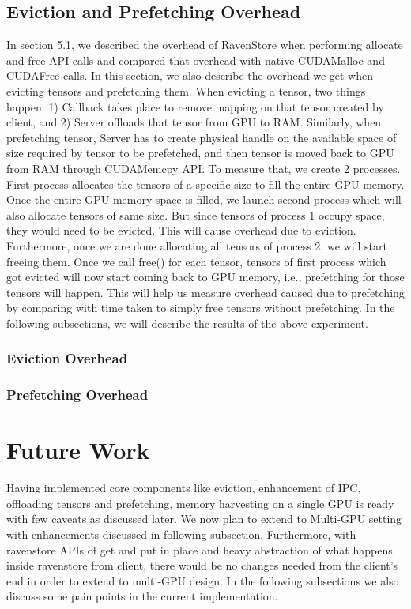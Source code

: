 \documentclass{article}
\begin{document}
\subsection{Eviction and Prefetching Overhead}
In section 5.1, we described the overhead of RavenStore when performing allocate and free API calls and compared that overhead with 
native CUDAMalloc and CUDAFree calls. In this section, we also describe the overhead we get when evicting tensors and prefetching them.
When evicting a tensor, two things happen: 1) Callback takes place to remove mapping on that tensor created by client, and 2) Server
offloads that tensor from GPU to RAM. Similarly, when prefetching tensor, Server has to create physical handle on the available space of
size required by tensor to be prefetched, and then tensor is moved back to GPU from RAM through CUDAMemcpy API.
To measure that, we create 2 processes. First process allocates the tensors of a specific size to fill the entire GPU memory. Once the entire GPU
memory space is filled, we launch second process which will also allocate tensors of same size. But since tensors of process 1 occupy space, they would
need to be evicted. This will cause overhead due to eviction. Furthermore, once we are done allocating all tensors of process 2, we will start freeing them.
Once we call free() for each tensor, tensors of first process which got evicted will now start coming back to GPU memory, i.e., prefetching for those
tensors will happen. This will help us measure overhead caused due to prefetching by comparing with time taken to simply free tensors without prefetching.
In the following subsections, we will describe the results of the above experiment.

\subsubsection{Eviction Overhead}
\subsubsection{Prefetching Overhead}

\section{Future Work}
Having implemented core components like eviction, enhancement of IPC, offloading tensors and prefetching, memory harvesting
on a single GPU is ready with few caveats as discussed later. We now plan
to extend to Multi-GPU setting with enhancements discussed in following subsection. 
Furthermore, with ravenstore APIs of get and put in place and heavy abstraction of what
happens inside ravenstore from client, there would be no changes needed from the client's end
in order to extend to multi-GPU design. In the following subsections we also discuss some pain points in the current implementation.
\end{document}
